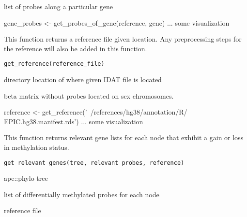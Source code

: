 \documentclass[a4paper]{book}
\begin{document}
%
\begin{Value}
list of probes along a particular gene
\end{Value}
%
\begin{Examples}
\begin{ExampleCode}
gene_probes <- get_probes_of_gene(reference, gene)
... some visualization 
\end{ExampleCode}
\end{Examples}
%
\begin{Description}\relax
This function returns a reference file given location. Any preprocessing 
steps for the reference will also be added in this function.
\end{Description}
%
\begin{Usage}
\begin{verbatim}
get_reference(reference_file)
\end{verbatim}
\end{Usage}
%
\begin{Arguments}
\begin{ldescription}
\item[\code{reference\_file}] directory location of where given IDAT file is located
\end{ldescription}
\end{Arguments}
%
\begin{Value}
beta matrix without probes located on sex chromosomes.
\end{Value}
%
\begin{Examples}
\begin{ExampleCode}
reference <- get_reference('~/references/hg38/annotation/R/
EPIC.hg38.manifest.rds')
... some visualization 
\end{ExampleCode}
\end{Examples}
%
\begin{Description}\relax
This function returns relevant gene lists for each node that exhibit a 
gain or loss in methylation status.
\end{Description}
%
\begin{Usage}
\begin{verbatim}
get_relevant_genes(tree, relevant_probes, reference)
\end{verbatim}
\end{Usage}
%
\begin{Arguments}
\begin{ldescription}
\item[\code{tree}] ape::phylo tree

\item[\code{relevant\_probes}] list of differentially methylated probes for each 
node

\item[\code{reference}] reference file
\end{ldescription}
\end{Arguments}
\end{document}
